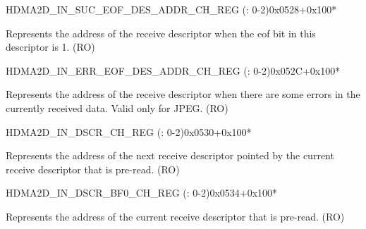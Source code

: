 \begin{register}{H}{DMA2D\_IN\_SUC\_EOF\_DES\_ADDR\_CH\_REG (: 0-2)}{0x0528+0x100*}\label{regdesc:DMA2DINSUCEOFDESADDRCHNREG}
%
\regnewline%
\begin{regdesc}\begin{reglist}
\label{fielddesc:DMA2DINSUCEOFDESADDRCHN}\item [DMA2D\_IN\_SUC\_EOF\_DES\_ADDR\_CH\regindex{n}] Represents the address of the receive descriptor when the eof bit in this descriptor is 1. (RO)
\end{reglist}\end{regdesc}
\end{register}


\begin{register}{H}{DMA2D\_IN\_ERR\_EOF\_DES\_ADDR\_CH\_REG (: 0-2)}{0x052C+0x100*}\label{regdesc:DMA2DINERREOFDESADDRCHNREG}
%
\regnewline%
\begin{regdesc}\begin{reglist}
\label{fielddesc:DMA2DINERREOFDESADDRCHN}\item [DMA2D\_IN\_ERR\_EOF\_DES\_ADDR\_CH\regindex{n}] Represents the address of the receive descriptor when there are some errors in the currently received data. Valid only for JPEG. (RO)
\end{reglist}\end{regdesc}
\end{register}


\begin{register}{H}{DMA2D\_IN\_DSCR\_CH\_REG (: 0-2)}{0x0530+0x100*}\label{regdesc:DMA2DINDSCRCHNREG}
%
\regnewline%
\begin{regdesc}\begin{reglist}
\label{fielddesc:DMA2DINLINKDSCRCHN}\item [DMA2D\_INLINK\_DSCR\_CH\regindex{n}] Represents the address of the next receive descriptor pointed by the current receive descriptor that is pre-read. (RO)
\end{reglist}\end{regdesc}
\end{register}


\begin{register}{H}{DMA2D\_IN\_DSCR\_BF0\_CH\_REG (: 0-2)}{0x0534+0x100*}\label{regdesc:DMA2DINDSCRBF0CHNREG}
%
\regnewline%
\begin{regdesc}\begin{reglist}
\label{fielddesc:DMA2DINLINKDSCRBF0CHN}\item [DMA2D\_INLINK\_DSCR\_BF0\_CH\regindex{n}] Represents the address of the current receive descriptor that is pre-read. (RO)
\end{reglist}\end{regdesc}
\end{register}


